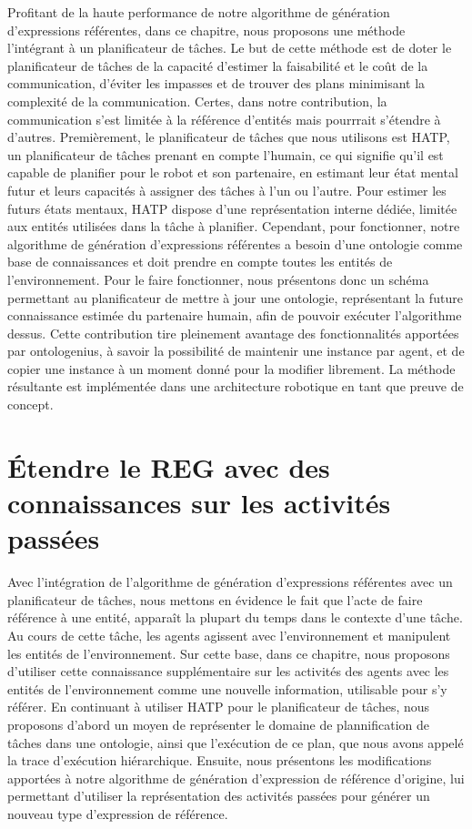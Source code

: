 Profitant de la haute performance de notre algorithme de génération d'expressions référentes, dans ce chapitre, nous proposons une méthode l'intégrant à un planificateur de tâches. Le but de cette méthode est de doter le planificateur de tâches de la capacité d'estimer la faisabilité et le coût de la communication, d'éviter les impasses et de trouver des plans minimisant la complexité de la communication. Certes, dans notre contribution, la communication s'est limitée à la référence d'entités mais pourrrait s'étendre à d'autres. Premièrement, le planificateur de tâches que nous utilisons est HATP, un planificateur de tâches prenant en compte l'humain, ce qui signifie qu'il est capable de planifier pour le robot et son partenaire, en estimant leur état mental futur et leurs capacités à assigner des tâches à l'un ou l'autre. Pour estimer les futurs états mentaux, HATP dispose d'une représentation interne dédiée, limitée aux entités utilisées dans la tâche à planifier. Cependant, pour fonctionner, notre algorithme de génération d'expressions référentes a besoin d'une ontologie comme base de connaissances et doit prendre en compte toutes les entités de l'environnement. Pour le faire fonctionner, nous présentons donc un schéma permettant au planificateur de mettre à jour une ontologie, représentant la future connaissance estimée du partenaire humain, afin de pouvoir exécuter l'algorithme dessus. Cette contribution tire pleinement avantage des fonctionnalités apportées par ontologenius, à savoir la possibilité de maintenir une instance par agent, et de copier une instance à un moment donné pour la modifier librement. La méthode résultante est implémentée dans une architecture robotique en tant que preuve de concept. 

\section*{Étendre le REG avec des connaissances sur les activités passées}

Avec l'intégration de l'algorithme de génération d'expressions référentes avec un planificateur de tâches, nous mettons en évidence le fait que l'acte de faire référence à une entité, apparaît la plupart du temps dans le contexte d'une tâche. Au cours de cette tâche, les agents agissent avec l'environnement et manipulent les entités de l'environnement. Sur cette base, dans ce chapitre, nous proposons d'utiliser cette connaissance supplémentaire sur les activités des agents avec les entités de l'environnement comme une nouvelle information, utilisable pour s'y référer. En continuant à utiliser HATP pour le planificateur de tâches, nous proposons d'abord un moyen de représenter le domaine de plannification de tâches dans une ontologie, ainsi que l'exécution de ce plan, que nous avons appelé la trace d'exécution hiérarchique. Ensuite, nous présentons les modifications apportées à notre algorithme de génération d'expression de référence d'origine, lui permettant d'utiliser la représentation des activités passées pour générer un nouveau type d'expression de référence. 

